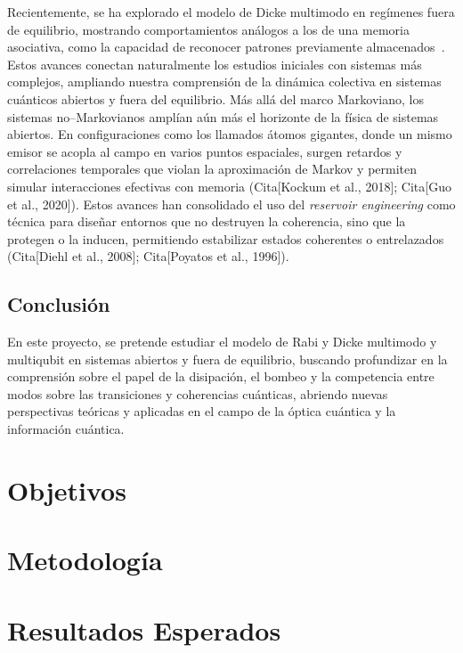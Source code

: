 \documentclass[onecolumn,notitlepage,letterpaper,aps,pra,12pt]{article}
\numberwithin{equation}{section}
\begin{document}
Recientemente, se ha explorado el modelo de Dicke multimodo en regímenes fuera de equilibrio, mostrando comportamientos análogos a los de una memoria asociativa, como la capacidad de reconocer patrones previamente almacenados~\cite{fiorelli2020}. Estos avances conectan naturalmente los estudios iniciales con sistemas más complejos, ampliando nuestra comprensión de la dinámica colectiva en sistemas cuánticos abiertos y fuera del equilibrio.
Más allá del marco Markoviano, los sistemas no–Markovianos amplían aún más el horizonte de la física de sistemas abiertos. En configuraciones como los llamados átomos gigantes, donde un mismo emisor se acopla al campo en varios puntos espaciales, surgen retardos y correlaciones temporales que violan la aproximación de Markov y permiten simular interacciones efectivas con memoria (Cita[Kockum et al., 2018]; Cita[Guo et al., 2020]). Estos avances han consolidado el uso del \textit{reservoir engineering} como técnica para diseñar entornos que no destruyen la coherencia, sino que la protegen o la inducen, permitiendo estabilizar estados coherentes o entrelazados (Cita[Diehl et al., 2008]; Cita[Poyatos et al., 1996]).



\subsection{Conclusión}

En este proyecto, se pretende estudiar el modelo de Rabi y Dicke  multimodo y multiqubit en sistemas abiertos y fuera de equilibrio, buscando profundizar en la comprensión sobre el papel de la disipación, el bombeo y la competencia entre modos sobre las transiciones y coherencias cuánticas, abriendo nuevas perspectivas teóricas y aplicadas en el campo de la óptica cuántica y la información cuántica. 




\section{Objetivos}

\section{Metodología}

\section{Resultados Esperados}
\end{document}
